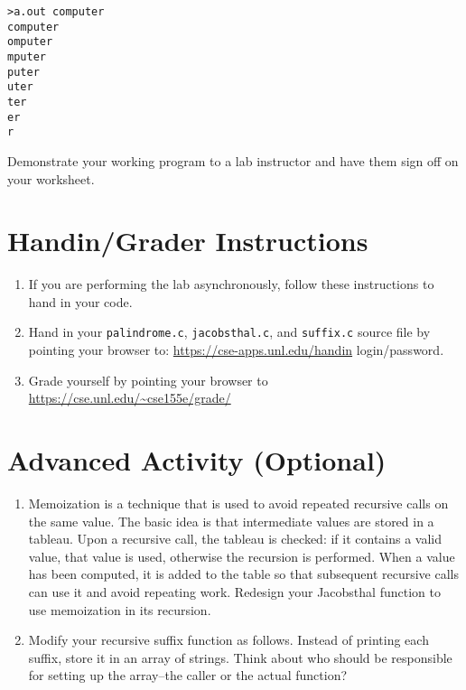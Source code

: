 \documentclass[12pt]{scrartcl}
\begin{document}
\begin{verbatim}
>a.out computer
computer
omputer
mputer
puter
uter
ter
er
r
\end{verbatim}

Demonstrate your working program to a lab instructor and have them 
sign off on your worksheet.


\section{Handin/Grader Instructions}

\begin{enumerate}
  \item If you are performing the lab asynchronously, follow these instructions to hand in your code.
  \item Hand in your \texttt{palindrome.c}, \texttt{jacobsthal.c}, and \texttt{suffix.c} source file by pointing your browser to:
  	\url{https://cse-apps.unl.edu/handin}
	login/password.
  \item Grade yourself by pointing your browser to
  	\url{https://cse.unl.edu/~cse155e/grade/}
\end{enumerate}

\section{Advanced Activity (Optional)}

\begin{enumerate}
  \item Memoization is a technique that is used to avoid repeated 
  	recursive calls on the same value.  The basic idea is that intermediate 
	values are stored in a tableau.  Upon a recursive call, the tableau is 
	checked: if it contains a valid value, that value is used, otherwise the 
	recursion is performed.  When a value has been computed, it is added 
	to the table so that subsequent recursive calls can use it and avoid 
	repeating work.  Redesign your Jacobsthal function to use memoization 
	in its recursion.
  \item Modify your recursive suffix function as follows.  Instead of printing 
	each suffix, store it in an array of strings.  Think about who should be 
	responsible for setting up the array--the caller or the actual function? 
\end{enumerate}
	
\end{document}
